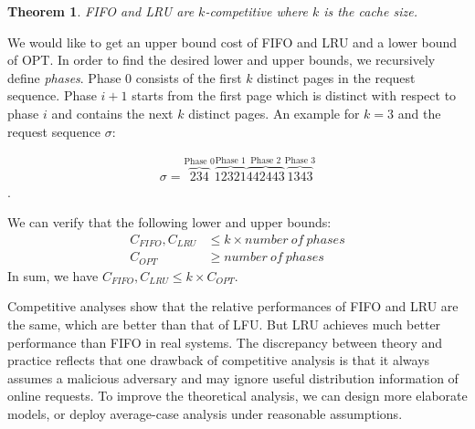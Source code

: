 \documentclass{article}
\newtheorem{theorem}{Theorem}
\begin{document}
\begin{theorem}
FIFO and LRU are $k$-competitive where $k$ is the cache size.
\end{theorem}

We would like to get an upper bound cost of FIFO and LRU and a lower bound of OPT. 
In order to find the desired lower and upper bounds, we recursively define \emph{phases}. 
Phase $0$ consists of the first $k$ distinct pages in the request sequence. 
Phase $i + 1$ starts from the first page which is distinct with respect to phase $i$ and contains the next $k$ distinct pages. 
An example for $k=3$ and the request sequence $\sigma$:

\begin{align*}
  \sigma = \overbrace{2 3 4}^{\text{Phase 0}} \overbrace{1 2 3 2 1}^{\text{Phase 1}} \overbrace{4 4 2 4 4 3}^{\text{Phase 2}} \overbrace{1 3 4 3}^{\text{Phase 3}}
\end{align*}.

We can verify that the following lower and upper bounds:
\begin{align*}
   C_{FIFO}, C_{LRU} &\leq k \times number~of~phases \\
  C_{OPT} &\geq number~of~phases
\end{align*}
In sum, we have $C_{FIFO}, C_{LRU} \leq k \times C_{OPT}$.

Competitive analyses show that the relative performances of FIFO and LRU are the same, which are better than that of LFU.
But LRU achieves much better performance than FIFO in real systems. 
The discrepancy between theory and practice reflects that one drawback of competitive analysis is 
that it always assumes a malicious adversary and may ignore useful distribution information of online requests. 
To improve the theoretical analysis, we can design more elaborate models, 
or deploy average-case analysis under reasonable assumptions. 
\end{document}
